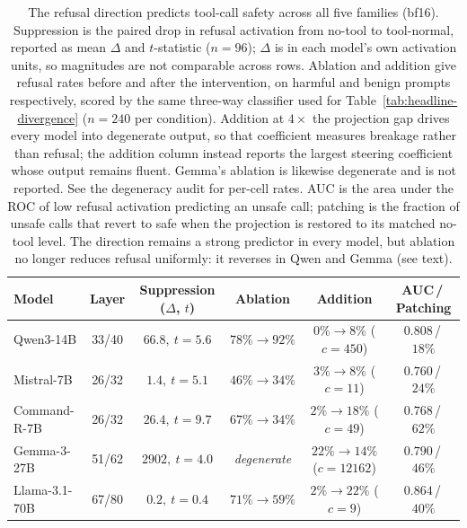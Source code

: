 \begin{table}[t]
\centering
\setlength{\tabcolsep}{4pt}
\caption{The refusal direction predicts tool-call safety across all five families (bf16).
Suppression is the paired drop in refusal activation from no-tool to tool-normal, reported as
mean $\Delta$ and $t$-statistic ($n{=}96$); $\Delta$ is in each model's own activation units, so
magnitudes are not comparable across rows. Ablation and addition give refusal rates before and
after the intervention, on harmful and benign prompts respectively, scored by the same
three-way classifier used for Table~\ref{tab:headline-divergence} ($n{=}240$ per condition).
Addition at $4\times$ the projection gap drives every model into degenerate output, so that
coefficient measures breakage rather than refusal; the addition column instead reports the
largest steering coefficient whose output remains fluent. Gemma's ablation is likewise
degenerate and is not reported. See the degeneracy audit for per-cell rates.
AUC is the area under the ROC of low refusal activation predicting an unsafe call; patching is
the fraction of unsafe calls that revert to safe when the projection is restored to its matched
no-tool level. The direction remains a strong predictor in every model, but ablation no longer
reduces refusal uniformly: it reverses in Qwen and Gemma (see text).}
\label{tab:mech}
  \begin{tabular}{lccccc}
\toprule
Model & Layer & Suppression ($\Delta$, $t$) & Ablation & Addition & AUC\,/\,Patching \\
\midrule
Qwen3-14B      & 33/40 & $66.8,\ t{=}5.6$  & $78\%\!\to\!92\%$ & $0\%\!\to\!8\%$ ($c{=}450$) & $0.808$\,/\,$18\%$ \\
Mistral-7B     & 26/32 & $1.4,\ t{=}5.1$  & $46\%\!\to\!34\%$ & $3\%\!\to\!8\%$ ($c{=}11$) & $0.760$\,/\,$24\%$ \\
Command-R-7B   & 26/32 & $26.4,\ t{=}9.7$  & $67\%\!\to\!34\%$ & $2\%\!\to\!18\%$ ($c{=}49$) & $0.768$\,/\,$62\%$ \\
Gemma-3-27B    & 51/62 & $2902,\ t{=}4.0$  & \emph{degenerate} & $22\%\!\to\!14\%$ ($c{=}12162$) & $0.790$\,/\,$46\%$ \\
Llama-3.1-70B  & 67/80 & $0.2,\ t{=}0.4$  & $71\%\!\to\!59\%$ & $2\%\!\to\!22\%$ ($c{=}9$) & $0.864$\,/\,$40\%$ \\
\bottomrule
\end{tabular}
\end{table}

